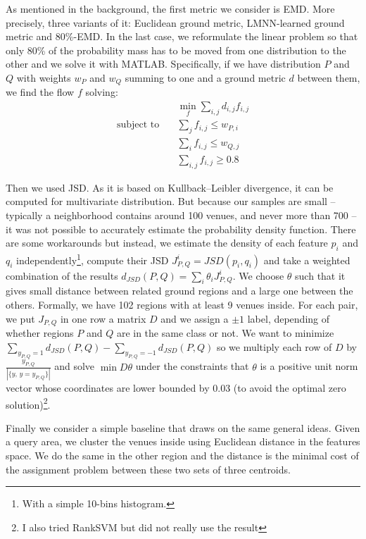 As mentioned in the background, the first metric we consider is EMD. More
precisely, three variants of it: Euclidean ground metric, LMNN-learned ground
metric and 80\%-EMD. In the last case, we reformulate the linear problem so
that only 80\% of the probability mass has to be moved from one distribution
to the other and we solve it with MATLAB.  Specifically, if we have
distribution $P$ and $Q$ with weights $w_P$ and $w_Q$ summing to one and a ground metric $d$
between them, we find the flow $f$ solving:
\begin{align*}
	&\quad \underset{f}{\min} \sum_{i,j} d_{i,j} f_{i,j} \\
	\text{subject to} &\quad \sum_j f_{i,j} \leq w_{P,i} \\
	&\quad \sum_i f_{i,j} \leq w_{Q,j} \\
	&\quad \sum_{i,j} f_{i,j} \geq 0.8 
\end{align*}

Then we used JSD. As it is based on Kullback--Leibler divergence, it can be
computed for multivariate distribution. But because our samples are small --
typically a neighborhood contains around 100 venues, and never more than 700 --
it was not possible to accurately estimate the probability density function.
There are some workarounds \autocite{EstimateKL07} but instead, we estimate the
density of each feature $p_i$ and $q_i$ independently\footnote{With a simple
10-bins histogram.}, compute their JSD $J_{P,Q}^i = JSD(p_i, q_i)$ and take a
weighted combination of the results $d_{JSD}(P, Q) = \sum_i\theta_i J_{P,Q}^i$.
We choose $\theta$ such that it gives small distance between related ground
regions and a large one between the others. Formally, we have 102 regions with
at least 9 venues inside. For each pair, we put $J_{P,Q}$ in one row a matrix
$D$ and we assign a $\pm 1$ label, depending of whether regions $P$ and $Q$ are
in the same class or not. We want to minimize $\sum_{y_{P,Q} = 1} d_{JSD}(P, Q)
- \sum_{y_{P,Q} = -1} d_{JSD}(P, Q)$ so we multiply each row of $D$ by
$\frac{y_{P,Q}}{|\{y,\, y = y_{P,Q}\}|}$ and solve $\min D\theta$ under the
constraints that $\theta$ is a positive unit norm vector whose coordinates are
lower bounded by 0.03 (to avoid the optimal zero solution)\footnote{I also
tried RankSVM but did not really use the result}. 

Finally we consider a simple baseline that draws on the same general ideas.
Given a query area, we cluster the venues inside using Euclidean distance in
the features space. We do the same in the other region and the distance is the
minimal cost of the assignment problem between these two sets of three
centroids.


